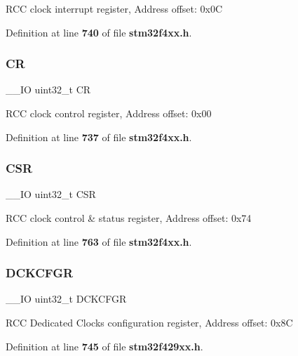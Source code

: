 R\+CC clock interrupt register, Address offset\+: 0x0C 

Definition at line \textbf{ 740} of file \textbf{ stm32f4xx.\+h}.

\mbox{\label{structRCC__TypeDef_ab40c89c59391aaa9d9a8ec011dd0907a}} 
\subsubsection{CR}
{\footnotesize\ttfamily \+\_\+\+\_\+\+IO uint32\+\_\+t CR}

R\+CC clock control register, Address offset\+: 0x00 

Definition at line \textbf{ 737} of file \textbf{ stm32f4xx.\+h}.

\mbox{\label{structRCC__TypeDef_a876dd0a8546697065f406b7543e27af2}} 
\subsubsection{C\+SR}
{\footnotesize\ttfamily \+\_\+\+\_\+\+IO uint32\+\_\+t C\+SR}

R\+CC clock control \& status register, Address offset\+: 0x74 

Definition at line \textbf{ 763} of file \textbf{ stm32f4xx.\+h}.

\mbox{\label{structRCC__TypeDef_a0a5d6d20b17d55b2e892a924b6e70296}} 
\subsubsection{D\+C\+K\+C\+F\+GR}
{\footnotesize\ttfamily \+\_\+\+\_\+\+IO uint32\+\_\+t D\+C\+K\+C\+F\+GR}

R\+CC Dedicated Clocks configuration register, Address offset\+: 0x8C 

Definition at line \textbf{ 745} of file \textbf{ stm32f429xx.\+h}.

\mbox{\label{structRCC__TypeDef_ae6ff257862eba6b4b367feea786bf1fd}} 
